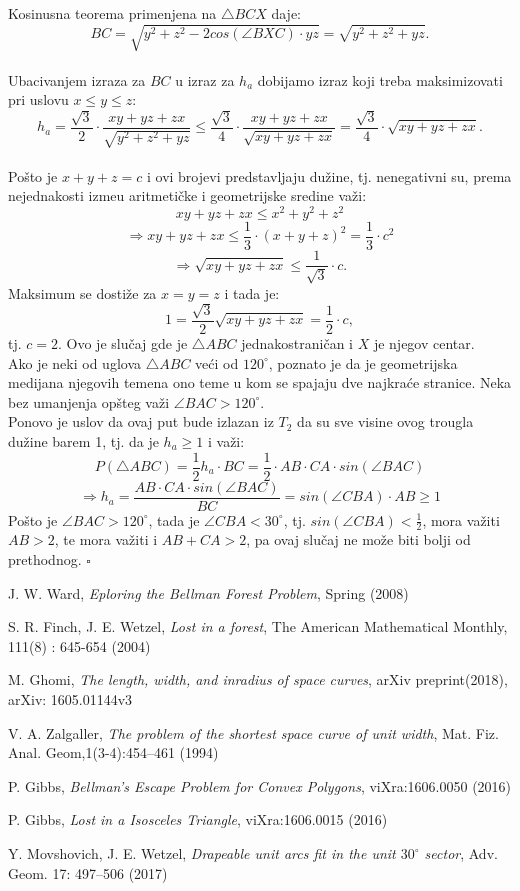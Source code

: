 \documentclass[11pt,letter]{article}
\begin{document}
\indent Kosinusna teorema primenjena na $\bigtriangleup BCX$ daje:
$$BC=\sqrt{y^2+z^2-2cos(\angle BXC)\cdot yz}=\sqrt{y^2+z^2+yz}.$$
\\
\indent Ubacivanjem izraza za $BC$ u izraz za $h_a$ dobijamo izraz koji treba maksimizovati  pri uslovu $x\leqslant y\leqslant z$:
$$h_a=\frac{\sqrt3}{2}\cdot \frac{xy+yz+zx}{\sqrt{y^2+z^2+yz}}\leqslant \frac{\sqrt3}{4}\cdot \frac{xy+yz+zx}{\sqrt{xy+yz+zx}}=\frac{\sqrt3}{4}\cdot \sqrt{xy+yz+zx}.$$
\\
\indent Po\v sto je $x+y+z=c$ i ovi brojevi predstavljaju du\v zine, tj. nenegativni su, prema nejednakosti izme\dj u aritmeti\v cke i geometrijske sredine va\v zi:
$$xy+yz+zx\leqslant x^2+y^2+z^2$$
$$\Longrightarrow xy+yz+zx\leqslant \frac{1}{3}\cdot (x+y+z)^2=\frac{1}{3}\cdot c^2$$
$$\Longrightarrow \sqrt{xy+yz+zx}\leqslant \frac{1}{\sqrt3}\cdot c.$$
\indent Maksimum se dosti\v ze za $x=y=z$ i tada je:
$$1=\frac{\sqrt3}{2}\sqrt{xy+yz+zx}=\frac{1}{2}\cdot c,$$
tj. $c=2$. Ovo je slu\v caj gde je $\bigtriangleup ABC$ jednakostrani\v can i $X$ je njegov centar.
\\
\indent Ako je neki od uglova $\bigtriangleup ABC$ ve\' ci od $120^\circ$, poznato je da je geometrijska medijana njegovih temena ono teme u kom se spajaju dve najkra\' ce stranice. Neka bez umanjenja op\v steg va\v zi $\angle BAC>120^\circ$.
\\
\indent Ponovo je uslov da ovaj put bude izlazan iz $T_2$ da su sve visine ovog trougla du\v zine barem 1, tj. da je $h_a\geqslant 1$ i va\v zi:
$$P(\bigtriangleup ABC)=\frac{1}{2} h_a \cdot BC=\frac{1}{2} \cdot AB\cdot CA \cdot sin(\angle BAC)$$
$$\Longrightarrow h_a=\frac{ AB\cdot CA \cdot sin(\angle BAC)}{BC}=sin(\angle CBA)\cdot AB\geqslant 1$$
\indent Po\v sto je $\angle BAC>120^\circ$, tada je $\angle CBA<30^\circ$, tj. $sin(\angle CBA)<\frac{1}{2}$, mora va\v ziti $AB>2$, te mora va\v ziti i $AB+CA>2$, pa ovaj slu\v caj ne mo\v ze biti bolji od prethodnog.
$\square$
\begin{thebibliography}{99}


    J. W. Ward,
    \textit{Eploring the Bellman Forest Problem},
    Spring (2008)

	S. R. Finch, J. E. Wetzel,
	\textit{Lost in a forest},
	The American Mathematical Monthly, 111(8) : 645-654 (2004)

 	M. Ghomi,
	\textit{The length, width, and inradius of space curves},
	arXiv preprint(2018), arXiv: 1605.01144v3

	V. A. Zalgaller,
	\textit{ The problem of the shortest space curve of unit width},
	 Mat. Fiz. Anal. Geom,1(3-4):454–461 (1994)

	P. Gibbs, 
	\textit{Bellman’s Escape Problem for Convex Polygons},
	viXra:1606.0050 (2016)

	P. Gibbs,
	\textit{Lost in a Isosceles Triangle},
	viXra:1606.0015 (2016)

	Y. Movshovich, J. E. Wetzel,
	\textit{Drapeable unit arcs fit in the unit $30^\circ$ sector},
	 Adv. Geom. 17: 497–506 (2017)


\end{thebibliography}
\end{document}
